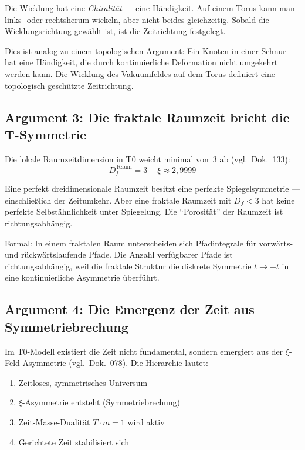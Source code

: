 Die Wicklung hat eine \emph{Chiralität} --- eine Händigkeit. Auf einem Torus kann man links- oder rechtsherum wickeln, aber nicht beides gleichzeitig. Sobald die Wicklungsrichtung gewählt ist, ist die Zeitrichtung festgelegt.

Dies ist analog zu einem topologischen Argument: Ein Knoten in einer Schnur hat eine Händigkeit, die durch kontinuierliche Deformation nicht umgekehrt werden kann. Die Wicklung des Vakuumfeldes auf dem Torus definiert eine topologisch geschützte Zeitrichtung.

\subsection{Argument 3: Die fraktale Raumzeit bricht die T-Symmetrie}

Die lokale Raumzeitdimension in T0 weicht minimal von~3 ab (vgl.\ Dok.~133):
\begin{equation}
	D_f^{\,\text{Raum}} = 3 - \xi \approx 2{,}9999
\end{equation}

Eine perfekt dreidimensionale Raumzeit besitzt eine perfekte Spiegelsymmetrie --- einschließlich der Zeitumkehr. Aber eine fraktale Raumzeit mit $D_f < 3$ hat keine perfekte Selbstähnlichkeit unter Spiegelung. Die ``Porosität'' der Raumzeit ist richtungsabhängig.

Formal: In einem fraktalen Raum unterscheiden sich Pfadintegrale für vorwärts- und rückwärtslaufende Pfade. Die Anzahl verfügbarer Pfade ist richtungsabhängig, weil die fraktale Struktur die diskrete Symmetrie $t \to -t$ in eine kontinuierliche Asymmetrie überführt.

\subsection{Argument 4: Die Emergenz der Zeit aus Symmetriebrechung}

Im T0-Modell existiert die Zeit nicht fundamental, sondern emergiert aus der $\xi$-Feld-Asymmetrie (vgl.\ Dok.~078). Die Hierarchie lautet:
\begin{enumerate}
	\item Zeitloses, symmetrisches Universum
	\item $\xi$-Asymmetrie entsteht (Symmetriebrechung)
	\item Zeit-Masse-Dualität $T \cdot m = 1$ wird aktiv
	\item Gerichtete Zeit stabilisiert sich
\end{enumerate}


